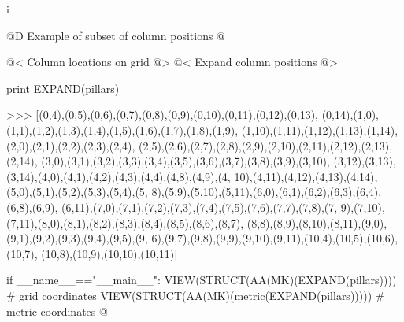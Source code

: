 i\documentclass[11pt,oneside]{article}    %
\begin{document}
@D Example of subset of column positions  @{
@< Column locations on grid @>
@< Expand column positions @>

print EXPAND(pillars)

>>> [(0,4),(0,5),(0,6),(0,7),(0,8),(0,9),(0,10),(0,11),(0,12),(0,13),
(0,14),(1,0),(1,1),(1,2),(1,3),(1,4),(1,5),(1,6),(1,7),(1,8),(1,9),
(1,10),(1,11),(1,12),(1,13),(1,14),(2,0),(2,1),(2,2),(2,3),(2,4),
(2,5),(2,6),(2,7),(2,8),(2,9),(2,10),(2,11),(2,12),(2,13),(2,14),
(3,0),(3,1),(3,2),(3,3),(3,4),(3,5),(3,6),(3,7),(3,8),(3,9),(3,10),
(3,12),(3,13),(3,14),(4,0),(4,1),(4,2),(4,3),(4,4),(4,8),(4,9),(4,
10),(4,11),(4,12),(4,13),(4,14),(5,0),(5,1),(5,2),(5,3),(5,4),(5,
8),(5,9),(5,10),(5,11),(6,0),(6,1),(6,2),(6,3),(6,4),(6,8),(6,9),
(6,11),(7,0),(7,1),(7,2),(7,3),(7,4),(7,5),(7,6),(7,7),(7,8),(7,
9),(7,10),(7,11),(8,0),(8,1),(8,2),(8,3),(8,4),(8,5),(8,6),(8,7),
(8,8),(8,9),(8,10),(8,11),(9,0),(9,1),(9,2),(9,3),(9,4),(9,5),(9,
6),(9,7),(9,8),(9,9),(9,10),(9,11),(10,4),(10,5),(10,6),(10,7),
(10,8),(10,9),(10,10),(10,11)]

if __name__=="__main__":
    VIEW(STRUCT(AA(MK)(EXPAND(pillars)))) # grid coordinates
    VIEW(STRUCT(AA(MK)(metric(EXPAND(pillars))))) # metric coordinates
@}
\end{document}
